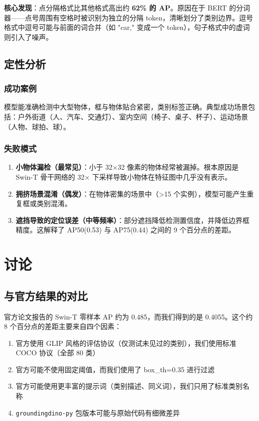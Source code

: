 \documentclass[12pt,a4paper]{ctexart}
\begin{document}
\textbf{核心发现}：点分隔格式比其他格式高出约 \textbf{62\% 的 AP}。原因在于 BERT 的分词器——点号周围有空格时被识别为独立的分隔 token，清晰划分了类别边界。逗号格式中逗号可能与前面的词合并（如 "car," 变成一个 token），句子格式中的虚词则引入了噪声。

\subsection{定性分析}

\subsubsection{成功案例}

模型能准确检测中大型物体，框与物体贴合紧密，类别标签正确。典型成功场景包括：户外街道（人、汽车、交通灯）、室内空间（椅子、桌子、杯子）、运动场景（人物、球拍、球）。

\subsubsection{失败模式}

\begin{enumerate}
    \item \textbf{小物体漏检（最常见）}：小于 32×32 像素的物体经常被漏掉。根本原因是 Swin-T 骨干网络的 32× 下采样导致小物体在特征图中几乎没有表示。
    \item \textbf{拥挤场景混淆（偶发）}：在物体密集的场景中（>15 个实例），模型可能产生重复框或类别混淆。
    \item \textbf{遮挡导致的定位误差（中等频率）}：部分遮挡降低检测置信度，并降低边界框精度。这解释了 AP50(0.53) 与 AP75(0.44) 之间的 9 个百分点的差距。
\end{enumerate}

\section{讨论}

\subsection{与官方结果的对比}

官方论文报告的 Swin-T 零样本 AP 约为 0.485，而我们得到的是 0.4055。这个约 8 个百分点的差距主要来自四个因素：

\begin{enumerate}
    \item 官方使用 GLIP 风格的评估协议（仅测试未见过的类别），我们使用标准 COCO 协议（全部 80 类）
    \item 官方可能不使用固定阈值，而我们使用了 box\_th=0.35 进行过滤
    \item 官方可能使用更丰富的提示词（类别描述、同义词），我们只用了标准类别名称
    \item \texttt{groundingdino-py} 包版本可能与原始代码有细微差异
\end{enumerate}
\end{document}
